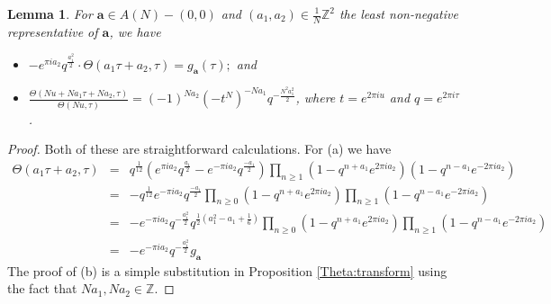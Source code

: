 \documentclass[12pt,amstex,amssymb]{article}
\theoremstyle{plain}
\newtheorem{lemma}[theorem]{Lemma}
\theoremstyle{definition}
\newtheorem{definition}[theorem]{Definition}
\def\Z{{\mathbb Z}}
\newcommand{\ba}{\mathbf{a}}
\begin{document}
%


\begin{lemma}\label{Theta:siegel} For $\ba \in A(N)-(0,0)$ and $(a_1,a_2) \in \frac{1}{N}\Z^2$ the least non-negative representative of $\ba$, we have
	\begin{itemize}
		\item[\rm (a)]  $\displaystyle -e^{\pi i a_2} q^{\frac{a_1^2}{2}}\cdot \Theta\left(a_1\tau + a_2,\tau \right) = g_\ba(\tau);$ and
		\item[\rm (b)]  $\displaystyle \frac{\Theta(Nu + Na_1\tau+Na_2, \tau)}{ \Theta(Nu,\tau)} = (-1)^{Na_2} (-t^{N})^{-Na_1}q^{-\frac{N^2a_1^2}{2}}$, where $t=e^{2\pi iu}$ and $q=e^{2\pi i \tau}$.
	\end{itemize}
	
\end{lemma}

\begin{proof}  Both of these are straightforward calculations.   For (a) we have  
	$$
	\begin{array}{rcl}
		\Theta\left(a_1\tau + a_2,\tau \right) &=&\displaystyle q^{\frac{1}{12}}\left( e^{\pi i a_2}q^{\frac{a_1}{2}} - e^{-\pi i a_2}q^{\frac{-a_1}{2}}\right)
		\prod_{n\ge 1}\left( 1-q^{n+a_1}e^{2\pi i a_2}\right)\left( 1-q^{n-a_1}e^{-2\pi i a_2}\right)\\
		&=&\displaystyle -q^{\frac{1}{12}}e^{-\pi i a_2}q^{\frac{-a_1}{2}} \prod_{n\ge 0}\left( 1-q^{n+a_1}e^{2\pi i a_2}\right)\prod_{n\ge 1} \left( 1-q^{n-a_1}e^{-2\pi i a_2}\right)\\
		&=&\displaystyle -e^{-\pi i a_2}q^{-\frac{a_1^2}{2}}q^{\frac{1}{2}(a_1^2-a_1+\frac{1}{6})} \prod_{n\ge 0}\left( 1-q^{n+a_1}e^{2\pi i a_2}\right)\prod_{n\ge 1} \left( 1-q^{n-a_1}e^{-2\pi i a_2}\right)\\
		&=&-e^{-\pi i a_2}q^{-\frac{a_1^2}{2}}g_\ba
	\end{array}
	$$
	The proof of (b) is a simple substitution in Proposition \ref{Theta:transform} using the fact that $Na_1, Na_2\in \Z$. 
\end{proof}
\end{document}
